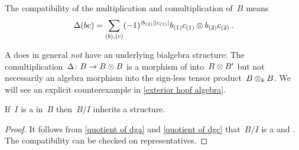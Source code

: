 \documentclass[a4paper,10pt,headings=standardclasses]{scrartcl}
\begin{document}
\begin{remark}
  The compatibility of the multiplication and comultiplication of~$B$ means
  \begin{gather*}
    \Delta(bc)
    =
    \sum_{(b), (c)}
    (-1)^{\lvert b_{(2)}\rvert \lvert c_{(1)}\rvert}
    b_{(1)} c_{(1)} \otimes b_{(2)} c_{(2)} \,.
  \end{gather*}

\end{remark}


\begin{warning}
  A {\dgb} does in general \emph{not} have an underlying bialgebra structure:
  The comultiplication~$\Delta \colon B \to B \otimes B$ is a morphism of {\dgas} into~$B \otimes B'$ but not necessarily an algebra morphism into the sign-less tensor product~$B \otimes_k B$.
  We will see an explicit counterexample in \cref{exterior hopf algebra}.
\end{warning}


\begin{lemma}
  \label{quotient of dgb}
  If~$I$ is a {\dgbi} in~$B$ then~$B/I$ inherits a {\dgb} structure.
\end{lemma}

\begin{proof}
  It follows from \cref{quotient of dga} and \cref{quotient of dgc} that~$B/I$ is a {\dga} and {\dgc}.
  The compatibility can be checked on representatives.
\end{proof}
\end{document}
